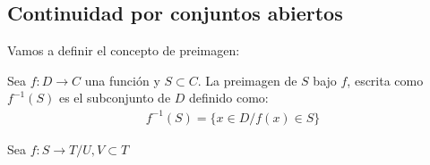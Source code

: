 \documentclass{../Topologia.tex}
\begin{document}
\subsection{Continuidad por conjuntos abiertos}
Vamos a definir el concepto de preimagen:
\begin{defin}
	Sea $f:D \to C$ una función y $S\subset C$. La preimagen de $S$ bajo $f$,
	escrita como $f^{-1}(S)$ es el subconjunto de $D$ definido como:
	\begin{equation}
		\begin{split}
			f^{-1}(S) = \{ x \in D / f(x) \in S \}
		\end{split}
	\end{equation}
\end{defin}

Sea $f:S \to T / U,V \subset T$
\end{document}
